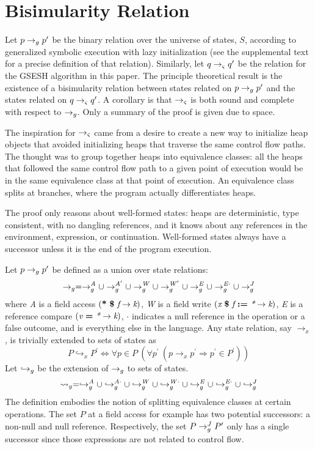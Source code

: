 \section{Bisimularity Relation}
Let $p \rightarrow_{g} p^\prime$ be the binary relation over the universe of states, $S$,
according to generalized symbolic execution with lazy initialization
(see the supplemental text for a precise definition of that
relation). Similarly, let $q \rightarrow_{\varsigma} q^\prime$ be the relation for the GSESH
algorithm in this paper. The principle theoretical result is the
existence of a bisimularity relation between states related on $p \rightarrow_{g} p^\prime$
and the states related on $q \rightarrow_{\varsigma} q^\prime$. A corollary is that $\rightarrow_{\varsigma}$ is
both sound and complete with respect to $\rightarrow_{g}$. Only a summary of the
proof is given due to space.

The inspiration for $\rightarrow_{\varsigma}$ came from a desire to create
a new way to initialize heap objects that avoided initializing heaps
that traverse the same control flow paths. The thought was to group together heaps
into equivalence classes: all the heaps that followed the same control
flow path to a given point of execution would be in the same
equivalence class at that point of execution. An equivalence class
splits at branches, where the program actually differentiates heaps.

The proof only reasons about well-formed states: heaps are
deterministic, type consistent, with no dangling references, and it
knows about any references in the environment, expression, or
continuation. Well-formed states always have a successor unless it is
the end of the program execution.

Let $p \rightarrow_{g} p^\prime$ be defined as a union over state relations:
$$
\rightarrow_{g} = \rightarrow_{g}^\mathit{A} \cup  \rightarrow_{g}^\mathit{A^\prime} \cup \rightarrow_{g}^\mathit{W} \cup \rightarrow_{g}^\mathit{W^\prime} \cup \rightarrow_{g}^\mathit{E} \cup \rightarrow_{g}^\mathit{E\cdot} \cup \rightarrow_{g}^{J}
$$
where \emph{A} is a field access $\lp \cfgt{*}\ \cfgt{\$}\ \cfgnt{f}
\rightarrow \cfgnt{k}\rp$, \emph{W} is a field write $(
\emph{x}\ \textbf{\$}\ \emph{f}\ \textbf{:=}\ \emph{*} \rightarrow
\emph{k})$, \emph{E} is a reference compare $(
\emph{v}\ \textbf{=}\ \emph{*} \rightarrow \emph{k})$, $\cdot$
indicates a null reference in the operation or a false outcome, and
\emph{\com} is everything else in the language. Any state relation, say $\rightarrow_x$, is trivially extended to sets of states as
$$
P \hookrightarrow_x P^\prime \Longleftrightarrow \forall p \in P\ (\forall p^\prime\ (p \rightarrow_x p^\prime \Rightarrow p^\prime \in P^\prime))
$$
Let $\hookrightarrow_{g}$ be the extension of $\rightarrow_{g}$ to sets of states.
$$
\leadsto_{g} = \hookrightarrow_{g}^\mathit{A}
\cup \hookrightarrow_{g}^\mathit{A\cdot} \cup \hookrightarrow_{g}^\mathit{W} \cup
\hookrightarrow_{g}^\mathit{W\cdot} \cup \hookrightarrow_{g}^\mathit{E} \cup \hookrightarrow_{g}^\mathit{E\cdot}
\cup \hookrightarrow_{g}^{J}
$$
The definition embodies the notion of splitting equivalence classes at
certain operations. The set $P$ at a field access for example has two
potential successors: a non-null and null reference. Respectively, the
set $P \rightarrow_{g}^{J} P^\prime$ only has a single successor since those expressions
are not related to control flow.

